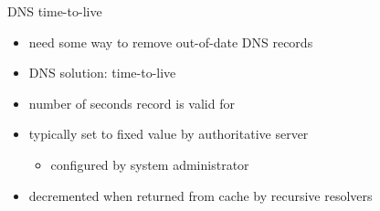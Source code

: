 \begin{frame}{DNS time-to-live}
    \begin{itemize}
    \item need some way to remove out-of-date DNS records
    \vspace{.5cm}
    \item DNS solution: time-to-live
    \item number of seconds record is valid for
    \vspace{.5cm}
    \item typically set to fixed value by authoritative server
        \begin{itemize}
        \item configured by system administrator
        \end{itemize}
    \item decremented when returned from cache by recursive resolvers
    \end{itemize}
\end{frame}

